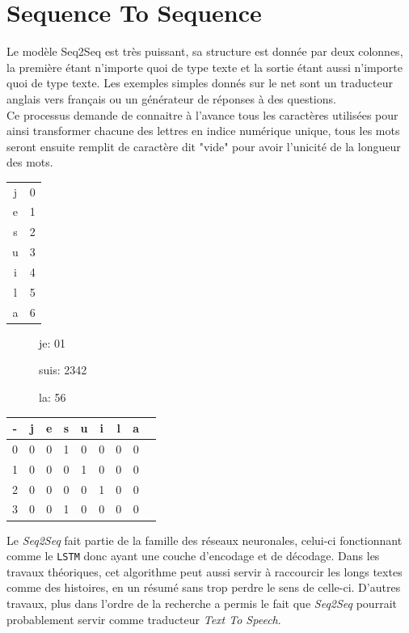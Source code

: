 \section{Sequence To Sequence}
Le modèle Seq2Seq est très puissant, sa structure est donnée par deux colonnes, la première étant n'importe quoi de type texte et la sortie étant aussi n'importe quoi de type texte. Les exemples simples donnés sur le net sont un traducteur anglais vers français ou un générateur de réponses à des questions.\\
\linebreak
Ce processus demande de connaitre à l'avance tous les caractères utilisées pour ainsi transformer chacune des lettres en indice numérique unique, tous les mots seront ensuite remplit de caractère dit "vide" pour avoir l'unicité de la longueur des mots.\\

\begin{multicols}{3}
\begin{tabular}{c|c}
j & 0\\
e & 1\\
s & 2\\
u & 3\\
i & 4\\
l & 5\\
a & 6\\
\end{tabular}
\begin{description}
\item[] je: 01
\item[] suis: 2342
\item[] la: 56
\end{description}
\begin{tabular}{c|cccccccc}
- & j & e & s & u & i & l & a\\
\hline
0 & 0 & 0 & 1 & 0 & 0 & 0 & 0\\
1 & 0 & 0 & 0 & 1 & 0 & 0 & 0\\
2 & 0 & 0 & 0 & 0 & 1 & 0 & 0\\
3 & 0 & 0 & 1 & 0 & 0 & 0 & 0\\
\end{tabular}
\end{multicols}

Le \textit{Seq2Seq} fait partie de la famille des réseaux neuronales, celui-ci fonctionnant comme le \texttt{LSTM} donc ayant une couche d'encodage et de décodage.\linebreak
Dans les travaux théoriques, cet algorithme peut aussi servir à raccourcir les longs textes comme des histoires, en un résumé sans trop perdre le sens de celle-ci.\linebreak
D'autres travaux, plus dans l'ordre de la recherche a permis le fait que \textit{Seq2Seq} pourrait probablement servir comme traducteur \textit{Text To Speech}.

